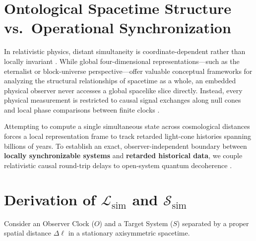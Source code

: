 \documentclass[11pt,a4paper]{article}
\begin{document}
\section{Ontological Spacetime Structure vs.\ Operational Synchronization}
In relativistic physics, distant simultaneity is coordinate-dependent rather than locally invariant \cite{einstein1905,reichenbach1958}. While global four-dimensional representations---such as the eternalist or block-universe perspective---offer valuable conceptual frameworks for analyzing the structural relationships of spacetime as a whole, an embedded physical observer never accesses a global spacelike slice directly. Instead, every physical measurement is restricted to causal signal exchanges along null cones and local phase comparisons between finite clocks \cite{page1983,bardeen1972}.

Attempting to compute a single simultaneous state across cosmological distances forces a local representation frame to track retarded light-cone histories spanning billions of years. To establish an exact, observer-independent boundary between \textbf{locally synchronizable systems} and \textbf{retarded historical data}, we couple relativistic causal round-trip delays to open-system quantum decoherence \cite{lindblad1976,caldeira1983}.

\section{Derivation of $\mathcal{L}_{\mathrm{sim}}$ and $\mathcal{S}_{\mathrm{sim}}$}
Consider an Observer Clock ($O$) and a Target System ($S$) separated by a proper spatial distance $\Delta \ell$ in a stationary axisymmetric spacetime.
\end{document}
